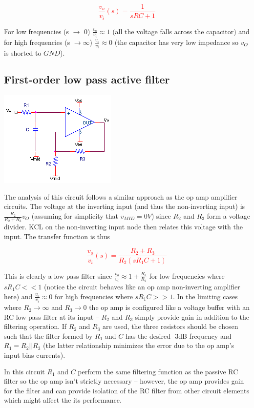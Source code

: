 \textcolor{red}{
\begin{equation}
\frac{v_{o}}{v_{i}}(s) = \frac{1}{sRC+1}
\label{eq:rcLPfilter}
\end{equation}
}

For low frequencies (s $\rightarrow$ 0) $\frac{v_{o}}{v_{i}} \approx 1$ (all the voltage falls across the capacitor) and for high frequencies (s $\rightarrow \infty$) $\frac{v_{o}}{v_{i}} \approx 0$ (the capacitor has very low impedance so $v_{O}$ is shorted to $GND$).

\subsection{First-order low pass active filter}
\begin{center}
	\includegraphics{schematics/1storderLPfilter.PNG}
\end{center}
The analysis of this circuit follows a similar approach as the op amp amplifier circuits. The voltage at the inverting input (and thus the non-inverting input) is $\frac{R_{2}}{R_{2}+R_{3}}v_{O}$ (assuming for simplicity that $v_{MID} = 0V$) since $R_{2}$ and $R_{3}$ form a voltage divider. KCL on the non-inverting input node then relates this voltage with the input. The transfer function is thus

\textcolor{red}{
\begin{equation}
\frac{v_{o}}{v_{i}}(s) = \frac{R_{2}+R_{3}}{R_{2}(sR_{1}C+1)}
\label{eq:1storderLPfilter}
\end{equation}
}

This is clearly a low pass filter since $\frac{v_{o}}{v_{i}} \approx 1+\frac{R_{3}}{R_{2}}$ for low frequencies where $sR_{1}C << 1$ (notice the circuit behaves like an op amp non-inverting amplifier here) and $\frac{v_{o}}{v_{i}} \approx 0$ for high frequencies where $sR_{1}C >> 1$. In the limiting cases where $R_{2} \rightarrow \infty$ and $R_{3} \rightarrow 0$ the op amp is configured like a voltage buffer with an RC low pass filter at its input -- $R_{2}$ and $R_{3}$ simply provide gain in addition to the filtering operation. If $R_{2}$ and $R_{3}$ are used, the three resistors should be chosen such that the filter formed by $R_{1}$ and $C$ has the desired -3dB frequency and $R_{1} = R_{2}||R_{3}$ (the latter relationship minimizes the error due to the op amp's input bias currents).
\par In this circuit $R_{1}$ and $C$ perform the same filtering function as the passive RC filter so the op amp isn't strictly necessary -- however, the op amp provides gain for the filter and can provide isolation of the RC filter from other circuit elements which might affect the its performance.

